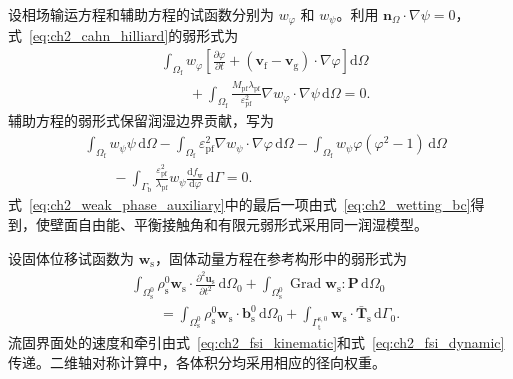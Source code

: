 设相场输运方程和辅助方程的试函数分别为 $w_{\varphi}$ 和 $w_{\psi}$。利用 $\boldsymbol{n}_{\Omega}\cdot\nabla\psi=0$，式~\eqref{eq:ch2_cahn_hilliard}的弱形式为
\begin{equation}
\begin{aligned}
&\int_{\Omega_{\mathrm f}}
w_{\varphi}
\left[
\frac{\partial\varphi}{\partial t}
+
\left(\boldsymbol{v}_{\mathrm f}-\boldsymbol{v}_{\mathrm g}\right)
\cdot\nabla\varphi
\right]
\mathrm d\Omega
\\
&\qquad
+
\int_{\Omega_{\mathrm f}}
\frac{M_{\mathrm{pf}}\lambda_{\mathrm{pf}}}
{\varepsilon_{\mathrm{pf}}^2}
\nabla w_{\varphi}\cdot\nabla\psi
\,\mathrm d\Omega
=0.
\label{eq:ch2_weak_phase_transport}
\end{aligned}
\end{equation}
辅助方程的弱形式保留润湿边界贡献，写为
\begin{equation}
\begin{aligned}
&\int_{\Omega_{\mathrm f}}w_{\psi}\psi\,\mathrm d\Omega
-
\int_{\Omega_{\mathrm f}}
\varepsilon_{\mathrm{pf}}^2
\nabla w_{\psi}\cdot\nabla\varphi
\,\mathrm d\Omega
-
\int_{\Omega_{\mathrm f}}
w_{\psi}\varphi\left(\varphi^2-1\right)
\,\mathrm d\Omega
\\
&\qquad
-
\int_{\Gamma_{\mathrm b}}
\frac{\varepsilon_{\mathrm{pf}}^2}{\lambda_{\mathrm{pf}}}
w_{\psi}
\frac{\mathrm df_{\mathrm w}}{\mathrm d\varphi}
\,\mathrm d\Gamma
=0.
\label{eq:ch2_weak_phase_auxiliary}
\end{aligned}
\end{equation}
式~\eqref{eq:ch2_weak_phase_auxiliary}中的最后一项由式~\eqref{eq:ch2_wetting_bc}得到，使壁面自由能、平衡接触角和有限元弱形式采用同一润湿模型。

设固体位移试函数为 $\boldsymbol{w}_{\mathrm s}$，固体动量方程在参考构形中的弱形式为
\begin{equation}
\begin{aligned}
&\int_{\Omega_{\mathrm s}^0}
\rho_{\mathrm s}^0
\boldsymbol{w}_{\mathrm s}\cdot
\frac{\partial^2\boldsymbol{u}_{\mathrm s}}{\partial t^2}
\,\mathrm d\Omega_0
+
\int_{\Omega_{\mathrm s}^0}
\operatorname{Grad}\boldsymbol{w}_{\mathrm s}:\boldsymbol{P}
\,\mathrm d\Omega_0
\\
&\qquad
=
\int_{\Omega_{\mathrm s}^0}
\rho_{\mathrm s}^0
\boldsymbol{w}_{\mathrm s}\cdot\boldsymbol{b}_{\mathrm s}^0
\,\mathrm d\Omega_0
+
\int_{\Gamma_{\mathrm t}^{\mathrm s,0}}
\boldsymbol{w}_{\mathrm s}\cdot\bar{\boldsymbol{T}}_{\mathrm s}
\,\mathrm d\Gamma_0.
\label{eq:ch2_weak_solid}
\end{aligned}
\end{equation}
流固界面处的速度和牵引由式~\eqref{eq:ch2_fsi_kinematic}和式~\eqref{eq:ch2_fsi_dynamic}传递。二维轴对称计算中，各体积分均采用相应的径向权重。

